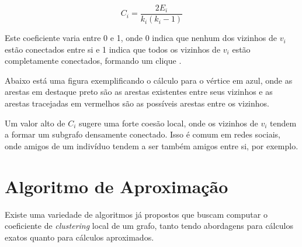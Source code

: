 \begin{equation}
    C_i = \frac{2E_i}{k_i(k_i-1)}
\end{equation}

Este coeficiente varia entre 0 e 1, onde 0 indica que nenhum dos vizinhos de $v_i$ estão
conectados entre si e 1 indica que todos os vizinhos de $v_i$ estão completamente conectados,
formando um clique \cite[49]{Barabasi69-70}.

Abaixo está uma figura exemplificando o cálculo para o vértice em azul, onde as arestas em
destaque preto são as arestas existentes entre seus vizinhos e as arestas tracejadas em
vermelhos são as possíveis arestas entre os vizinhos.


Um valor alto de $C_i$ sugere uma forte coesão local, onde os vizinhos de $v_i$ tendem a formar
um subgrafo densamente conectado. Isso é comum em redes sociais, onde amigos de um
indivíduo tendem a ser também amigos entre si, por exemplo.

\section{Algoritmo de Aproximação}\label{sec:algoritmo_aprox}

Existe uma variedade de algoritmos já propostos que buscam computar o coeficiente de
\textit{clustering} local de um grafo, tanto tendo abordagens para cálculos exatos quanto para cálculos aproximados.


